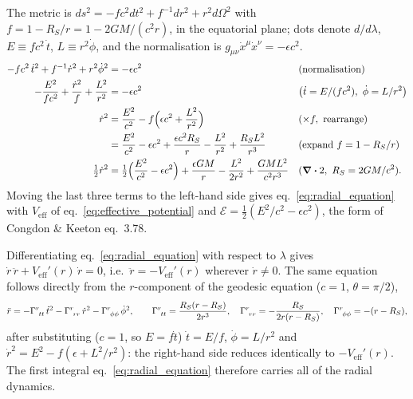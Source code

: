 \begin{derivation}
The metric is $ds^2 = -f c^2dt^2 + f^{-1}dr^2 + r^2d\Omega^2$ with
$f = 1 - R_S/r = 1 - 2GM/(c^2r)$, in the equatorial plane; dots denote
$d/d\lambda$, $E \equiv fc^2\,\dot t$, $L \equiv r^2\dot\phi$, and the normalisation is
$g_{\mu\nu}\dot x^\mu\dot x^\nu = -\epsilon c^2$.
\begin{align*}
-fc^2\,\dot t^2 + f^{-1}\dot r^2 + r^2\dot\phi^2 &= -\epsilon c^2
  && \text{(normalisation)} \\
-\frac{E^2}{fc^2} + \frac{\dot r^2}{f} + \frac{L^2}{r^2} &= -\epsilon c^2
  && \bigl(\dot t = E/(fc^2),\ \dot\phi = L/r^2\bigr) \\
\dot r^2 &= \frac{E^2}{c^2} - f\Bigl(\epsilon c^2 + \frac{L^2}{r^2}\Bigr)
  && (\times f,\ \text{rearrange}) \\
&= \frac{E^2}{c^2} - \epsilon c^2 + \frac{\epsilon c^2R_S}{r} - \frac{L^2}{r^2}
   + \frac{R_SL^2}{r^3}
  && (\text{expand } f = 1 - R_S/r) \\
\tfrac{1}{2}\dot r^2 &= \tfrac{1}{2}\Bigl(\frac{E^2}{c^2} - \epsilon c^2\Bigr) + \frac{\epsilon GM}{r}
   - \frac{L^2}{2r^2} + \frac{GML^2}{c^2r^3}
  && (\div 2,\ R_S = 2GM/c^2) .
\end{align*}
Moving the last three terms to the left-hand side gives
eq.~\eqref{eq:radial_equation} with $V_{\mathrm{eff}}$ of
eq.~\eqref{eq:effective_potential} and
$\mathcal{E} = \tfrac12(E^2/c^2 - \epsilon c^2)$, the form of Congdon \&
Keeton eq.~3.78.
\end{derivation}

\begin{derivation}
Differentiating eq.~\eqref{eq:radial_equation} with respect to $\lambda$
gives $\dot r\,\ddot r + V_{\mathrm{eff}}'(r)\,\dot r = 0$, i.e.\
$\ddot r = -V_{\mathrm{eff}}'(r)$ wherever $\dot r \neq 0$.  The same
equation follows directly from the $r$-component of the geodesic equation
($c = 1$, $\theta = \pi/2$),
\[
\ddot r = -\Gamma^{r}_{\ t t}\,\dot t^2 - \Gamma^{r}_{\ r r}\,\dot r^2
          - \Gamma^{r}_{\ \phi \phi}\,\dot\phi^2 ,
\qquad
\Gamma^{r}_{\ t t} = \frac{R_S(r - R_S)}{2r^3},\quad
\Gamma^{r}_{\ r r} = -\frac{R_S}{2r(r - R_S)},\quad
\Gamma^{r}_{\ \phi \phi} = -(r - R_S) ,
\]
after substituting ($c = 1$, so $E = f\dot t$) $\dot t = E/f$, $\dot\phi = L/r^2$ and
$\dot r^2 = E^2 - f(\epsilon + L^2/r^2)$: the right-hand side reduces
identically to $-V_{\mathrm{eff}}'(r)$.  The first integral
eq.~\eqref{eq:radial_equation} therefore carries all of the radial dynamics.
\end{derivation}

